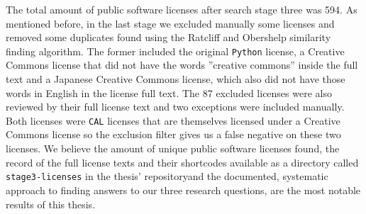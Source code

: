 The total amount of public software licenses after search stage three was 594. As mentioned before, in the last stage we excluded manually some licenses and removed some duplicates found using the Ratcliff and Obershelp similarity finding algorithm. The former included the original \texttt{Python} license, a Creative Commons license that did not have the words ''creative commons'' inside the full text and a Japanese Creative Commons license, which also did not have those words in English in the license full text. The 87 excluded licenses were also reviewed by their full license text and two exceptions were included manually. Both licenses were \texttt{CAL} licenses that are themselves licensed under a Creative Commons license so the exclusion filter gives us a false negative on these two licenses. We believe the amount of unique public software licenses found, the record of the full license texts and their shortcodes available as a directory called \texttt{stage3-licenses} in the thesis' repository\footnotemark[1] and the documented, systematic approach to finding answers to our three research questions, are the most notable results of this thesis.
